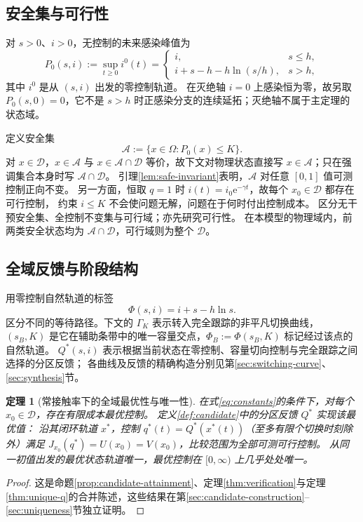 \documentclass[11pt,a4paper,UTF8]{ctexart}
\newtheorem{theorem}{定理}[section]
\theoremstyle{definition}
\newcommand{\Acal}{\mathcal A}
\newcommand{\Dcal}{\mathcal D}
\newcommand{\e}{\mathrm e}
\begin{document}
\subsection{安全集与可行性}
对 $s>0$、$i>0$，无控制的未来感染峰值为
\begin{equation}
 P_0(s,i):=\sup_{t\ge0}i^0(t)=
 \begin{cases}
  i,&s\le h,\\
  i+s-h-h\ln(s/h),&s>h,
 \end{cases}
 \label{eq:uncontrolled-future-peak}
\end{equation}
其中 $i^0$ 是从 $(s,i)$ 出发的零控制轨道。
在灭绝轴 $i=0$ 上感染恒为零，故另取 $P_0(s,0)=0$，它不是 $s>h$ 时正感染分支的连续延拓；灭绝轴不属于主定理的状态域。


定义安全集
\begin{equation}
 \Acal:=\{x\in\Omega:P_0(x)\le K\}.
 \label{eq:safe-set}
\end{equation}
对 $x\in\Dcal$，$x\in\Acal$ 与 $x\in\Acal\cap\Dcal$ 等价，故下文对物理状态直接写 $x\in\Acal$；只在强调集合本身时写 $\Acal\cap\Dcal$。
引理\ref{lem:safe-invariant}表明，$\Acal$ 对任意 $[0,1]$ 值可测控制正向不变。
另一方面，恒取 $q=1$ 时 $i(t)=i_0\e^{-\gamma t}$，故每个 $x_0\in\Dcal$ 都存在可行控制，
约束 $i\le K$ 不会使问题无解，问题在于何时付出控制成本。
\citet{AvramFreddiGoreac2022}区分无干预安全集、全控制不变集与可行域；\citet{FreddiGoreac2024}亦先研究可行性。
在本模型的物理域内，前两类安全状态均为 $\Acal\cap\Dcal$，可行域则为整个 $\Dcal$。

\subsection{全域反馈与阶段结构}
用零控制自然轨道的标签
\begin{equation}
\Phi(s,i)=i+s-h\ln s.
\label{eq:Phi}
\end{equation}
区分不同的等待路径。下文的 $\Gamma_K$ 表示转入完全跟踪的非平凡切换曲线，
$(s_B,K)$ 是它在辅助条带中的唯一容量交点，$\Phi_B:=\Phi(s_B,K)$ 标记经过该点的自然轨道。
$Q^*(s,i)$ 表示根据当前状态在零控制、容量切向控制与完全跟踪之间选择的分区反馈；
各曲线及反馈的精确构造分别见第\ref{sec:switching-curve}、\ref{sec:synthesis}节。

\begin{theorem}[常接触率下的全域最优性与唯一性]
\label{thm:main-overview}
在式\eqref{eq:constants}的条件下，对每个 $x_0\in\Dcal$，存在有限成本最优控制。
定义\ref{def:candidate}中的分区反馈 $Q^*$ 实现该最优值：
沿其闭环轨道 $x^*$，控制 $q^*(t)=Q^*(x^*(t))$（至多有限个切换时刻除外）满足
$J_{x_0}(q^*)=U(x_0)=V(x_0)$，比较范围为全部可测可行控制。
从同一初值出发的最优状态轨道唯一，最优控制在 $[0,\infty)$ 上几乎处处唯一。
\end{theorem}
\begin{proof}
这是命题\ref{prop:candidate-attainment}、定理\ref{thm:verification}与定理\ref{thm:unique-q}的合并陈述，这些结果在第\ref{sec:candidate-construction}--\ref{sec:uniqueness}节独立证明。
\end{proof}
\end{document}
